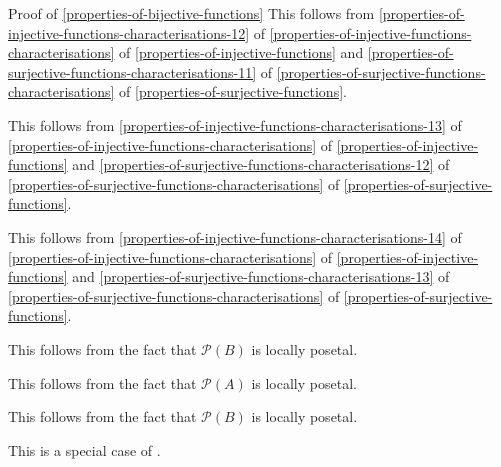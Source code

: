 \begin{Proof}{Proof of \cref{properties-of-bijective-functions}}
    This follows from \cref{properties-of-injective-functions-characterisations-12} of \cref{properties-of-injective-functions-characterisations} of \cref{properties-of-injective-functions} and \cref{properties-of-surjective-functions-characterisations-11} of \cref{properties-of-surjective-functions-characterisations} of \cref{properties-of-surjective-functions}.

    This follows from \cref{properties-of-injective-functions-characterisations-13} of \cref{properties-of-injective-functions-characterisations} of \cref{properties-of-injective-functions} and \cref{properties-of-surjective-functions-characterisations-12} of \cref{properties-of-surjective-functions-characterisations} of \cref{properties-of-surjective-functions}.

    This follows from \cref{properties-of-injective-functions-characterisations-14} of \cref{properties-of-injective-functions-characterisations} of \cref{properties-of-injective-functions} and \cref{properties-of-surjective-functions-characterisations-13} of \cref{properties-of-surjective-functions-characterisations} of \cref{properties-of-surjective-functions}.

    This follows from the fact that $\mathcal{P}(B)$ is locally posetal.

    This follows from the fact that $\mathcal{P}(A)$ is locally posetal.

    This follows from the fact that $\mathcal{P}(B)$ is locally posetal.

    This is a special case of .
\end{Proof}
\begin{appendices}

\end{appendices}

